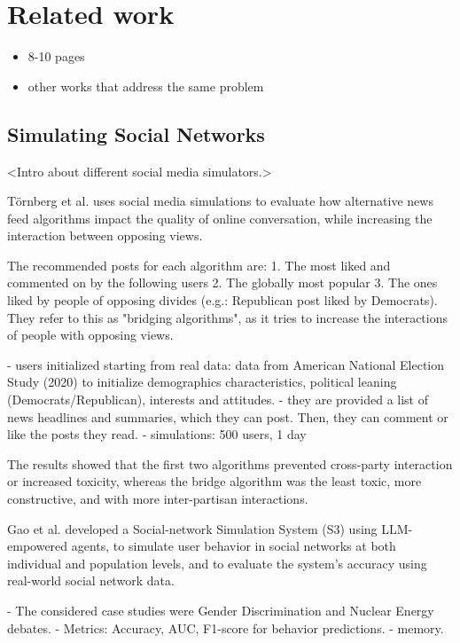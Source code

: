\section{Related work}
\label{sec:relatedwork}

\begin{itemize} 
    \item 8-10 pages
    \item other works that address the same problem 
\end{itemize}

\subsection{Simulating Social Networks}

<Intro about different social media simulators.>

Törnberg et al. \cite{törnberg2023simulatingsocialmediausing} uses social media simulations to evaluate how alternative news feed algorithms impact the quality of online conversation, while increasing the interaction between opposing views.

The recommended posts for each algorithm are:
1. The most liked and commented on by the following users
2. The globally most popular
3. The ones liked by people of opposing divides (e.g.: Republican post liked by Democrats). They refer to this as "bridging algorithms", as it tries to increase the interactions of people with opposing views.

- users initialized starting from real data: data from American National Election Study (2020) to initialize demographics characteristics, political leaning (Democrats/Republican), interests and attitudes.
- they are provided a list of news headlines and summaries, which they can post. Then, they can comment or like the posts they read.
- simulations: 500 users, 1 day

The results showed that the first two algorithms prevented cross-party interaction or increased toxicity, whereas the bridge algorithm was the least toxic, more constructive, and with more inter-partisan interactions.

Gao et al. \cite{gao2023s3socialnetworksimulationlarge} developed a Social-network Simulation System (S3) using LLM-empowered agents, to simulate user behavior in social networks at both individual and population levels, and to evaluate the system’s accuracy using real-world social network data.

- The considered case studies were Gender Discrimination and Nuclear Energy debates.
- Metrics: Accuracy, AUC, F1-score for behavior predictions.
- memory.


